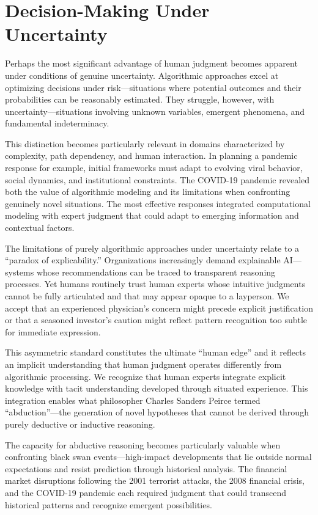 \documentclass[
  Letterpaper,
]{scrbook}
\begin{document}
\section{Decision-Making Under
Uncertainty}\label{decision-making-under-uncertainty}

Perhaps the most significant advantage of human judgment becomes
apparent under conditions of genuine uncertainty. Algorithmic approaches
excel at optimizing decisions under risk---situations where potential
outcomes and their probabilities can be reasonably estimated. They
struggle, however, with uncertainty---situations involving unknown
variables, emergent phenomena, and fundamental indeterminacy.

This distinction becomes particularly relevant in domains characterized
by complexity, path dependency, and human interaction. In planning a
pandemic response for example, initial frameworks must adapt to evolving
viral behavior, social dynamics, and institutional constraints. The
COVID-19 pandemic revealed both the value of algorithmic modeling and
its limitations when confronting genuinely novel situations. The most
effective responses integrated computational modeling with expert
judgment that could adapt to emerging information and contextual
factors.

The limitations of purely algorithmic approaches under uncertainty
relate to a ``paradox of explicability.'' Organizations increasingly
demand explainable AI---systems whose recommendations can be traced to
transparent reasoning processes. Yet humans routinely trust human
experts whose intuitive judgments cannot be fully articulated and that
may appear opaque to a layperson. We accept that an experienced
physician's concern might precede explicit justification or that a
seasoned investor's caution might reflect pattern recognition too subtle
for immediate expression.

This asymmetric standard constitutes the ultimate ``human edge'' and it
reflects an implicit understanding that human judgment operates
differently from algorithmic processing. We recognize that human experts
integrate explicit knowledge with tacit understanding developed through
situated experience. This integration enables what philosopher Charles
Sanders Peirce termed ``abduction''---the generation of novel hypotheses
that cannot be derived through purely deductive or inductive reasoning.

The capacity for abductive reasoning becomes particularly valuable when
confronting black swan events---high-impact developments that lie
outside normal expectations and resist prediction through historical
analysis. The financial market disruptions following the 2001 terrorist
attacks, the 2008 financial crisis, and the COVID-19 pandemic each
required judgment that could transcend historical patterns and recognize
emergent possibilities.
\end{document}
